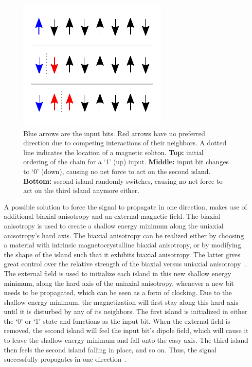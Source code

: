 \documentclass[11pt,a4paper,english]{article}
\begin{document}
\begin{figure}[b!]
    \centering
    \includegraphics[width=0.5\columnwidth]{Figures/Introduction/Soliton_random_walk_2steps.pdf}
    \caption{Blue arrows are the input bits. Red arrows have no preferred direction due to competing interactions of their neighbors. A dotted line indicates the location of a magnetic soliton. \textbf{Top:} initial ordering of the chain for a `1' (up) input. \textbf{Middle:} input bit changes to `0' (down), causing no net force to act on the second island. \textbf{Bottom:} second island randomly switches, causing no net force to act on the third island anymore either.}
    \label{fig:Intro_SolitonRandomWalk}
\end{figure}
A possible solution to force the signal to propagate in one direction, makes use of additional biaxial anisotropy and an external magnetic field. The biaxial anisotropy is used to create a shallow energy minimum along the uniaxial anisotropy's hard axis. The biaxial anisotropy can be realized either by choosing a material with intrinsic magnetocrystalline biaxial anisotropy, or by modifying the shape of the island such that it exhibits biaxial anisotropy. The latter gives great control over the relative strength of the biaxial versus uniaxial anisotropy~\cite{SubnanosecondPropagation_AnisotropyChains}. The external field is used to initialize each island in this new shallow energy minimum, along the hard axis of the uniaxial anisotropy, whenever a new bit needs to be propagated, which can be seen as a form of clocking. Due to the shallow energy minimum, the magnetization will first stay along this hard axis until it is disturbed by any of its neighbors. The first island is initialized in either the `0' or `1' state and functions as the input bit. When the external field is removed, the second island will feel the input bit's dipole field, which will cause it to leave the shallow energy minimum and fall onto the easy axis. The third island then feels the second island falling in place, and so on. Thus, the signal successfully propagates in one direction~\cite{NML_Carlton}. \par
\end{document}
